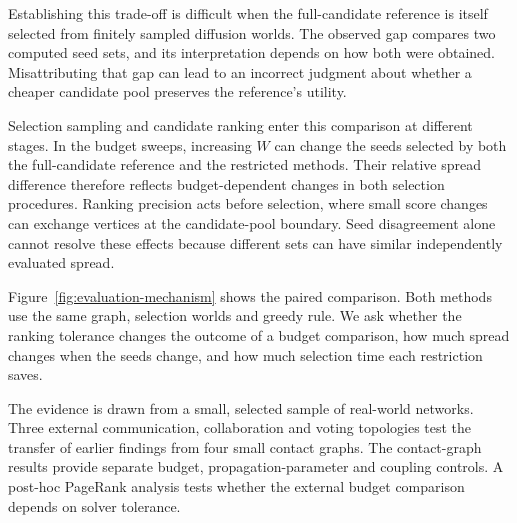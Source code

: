 \documentclass[smallextended]{svjour3}
\begin{document}
Establishing this trade-off is difficult when the full-candidate reference is itself selected from finitely sampled diffusion worlds. The observed gap compares two computed seed sets, and its interpretation depends on how both were obtained. Misattributing that gap can lead to an incorrect judgment about whether a cheaper candidate pool preserves the reference's utility.

Selection sampling and candidate ranking enter this comparison at different stages. In the budget sweeps, increasing $W$ can change the seeds selected by both the full-candidate reference and the restricted methods. Their relative spread difference therefore reflects budget-dependent changes in both selection procedures. Ranking precision acts before selection, where small score changes can exchange vertices at the candidate-pool boundary. Seed disagreement alone cannot resolve these effects because different sets can have similar independently evaluated spread.

Figure~\ref{fig:evaluation-mechanism} shows the paired comparison. Both methods use the same graph, selection worlds and greedy rule. We ask whether the ranking tolerance changes the outcome of a budget comparison, how much spread changes when the seeds change, and how much selection time each restriction saves.

The evidence is drawn from a small, selected sample of real-world networks. Three external communication, collaboration and voting topologies test the transfer of earlier findings from four small contact graphs. The contact-graph results provide separate budget, propagation-parameter and coupling controls. A post-hoc PageRank analysis tests whether the external budget comparison depends on solver tolerance.
\end{document}
